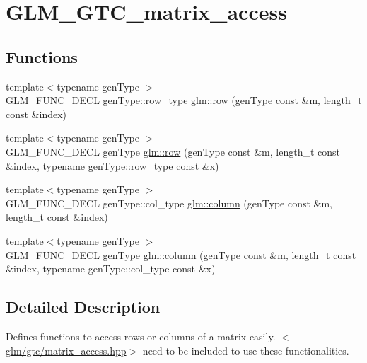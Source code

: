 \hypertarget{group__gtc__matrix__access}{\section{G\-L\-M\-\_\-\-G\-T\-C\-\_\-matrix\-\_\-access}
\label{group__gtc__matrix__access}
}
\subsection*{Functions}
\begin{DoxyCompactItemize}
\item 
{\footnotesize template$<$typename gen\-Type $>$ }\\G\-L\-M\-\_\-\-F\-U\-N\-C\-\_\-\-D\-E\-C\-L gen\-Type\-::row\-\_\-type \hyperlink{group__gtc__matrix__access_ga5b874831eef18913dbe30153e52a2476}{glm\-::row} (gen\-Type const \&m, length\-\_\-t const \&index)
\item 
{\footnotesize template$<$typename gen\-Type $>$ }\\G\-L\-M\-\_\-\-F\-U\-N\-C\-\_\-\-D\-E\-C\-L gen\-Type \hyperlink{group__gtc__matrix__access_gacb34e8dca9cd0efdd247a65e36ed0a86}{glm\-::row} (gen\-Type const \&m, length\-\_\-t const \&index, typename gen\-Type\-::row\-\_\-type const \&x)
\item 
{\footnotesize template$<$typename gen\-Type $>$ }\\G\-L\-M\-\_\-\-F\-U\-N\-C\-\_\-\-D\-E\-C\-L gen\-Type\-::col\-\_\-type \hyperlink{group__gtc__matrix__access_ga5c37fbeb062151f930e8a231c37e6b81}{glm\-::column} (gen\-Type const \&m, length\-\_\-t const \&index)
\item 
{\footnotesize template$<$typename gen\-Type $>$ }\\G\-L\-M\-\_\-\-F\-U\-N\-C\-\_\-\-D\-E\-C\-L gen\-Type \hyperlink{group__gtc__matrix__access_gaff0c6f887deb04ce0519084d32aadb85}{glm\-::column} (gen\-Type const \&m, length\-\_\-t const \&index, typename gen\-Type\-::col\-\_\-type const \&x)
\end{DoxyCompactItemize}


\subsection{Detailed Description}
Defines functions to access rows or columns of a matrix easily. $<$\hyperlink{matrix__access_8hpp}{glm/gtc/matrix\-\_\-access.\-hpp}$>$ need to be included to use these functionalities. 


